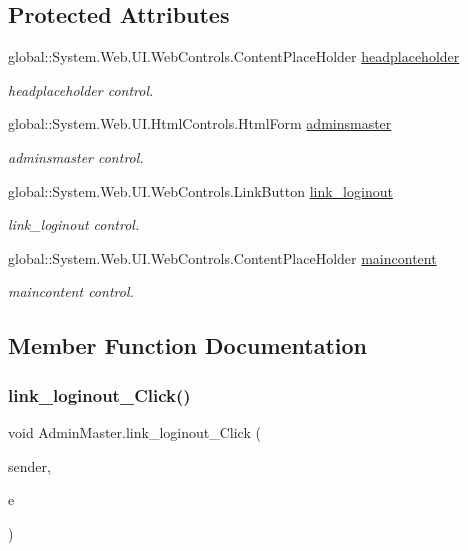 \subsection*{Protected Attributes}
\begin{DoxyCompactItemize}
\item 
global\+::\+System.\+Web.\+U\+I.\+Web\+Controls.\+Content\+Place\+Holder \mbox{\hyperlink{class_admin_master_a0336b034c5bd3fdcac6e741a0dd46d3e}{headplaceholder}}
\begin{DoxyCompactList}\small\item\em headplaceholder control. \end{DoxyCompactList}\item 
global\+::\+System.\+Web.\+U\+I.\+Html\+Controls.\+Html\+Form \mbox{\hyperlink{class_admin_master_a7a0a68bcef19e4ad48d5ce115625bcb3}{adminsmaster}}
\begin{DoxyCompactList}\small\item\em adminsmaster control. \end{DoxyCompactList}\item 
global\+::\+System.\+Web.\+U\+I.\+Web\+Controls.\+Link\+Button \mbox{\hyperlink{class_admin_master_af034ac4b0169ee38de68a4890606ff72}{link\+\_\+loginout}}
\begin{DoxyCompactList}\small\item\em link\+\_\+loginout control. \end{DoxyCompactList}\item 
global\+::\+System.\+Web.\+U\+I.\+Web\+Controls.\+Content\+Place\+Holder \mbox{\hyperlink{class_admin_master_ae059b3c96b9ee11748016a1a433f960f}{maincontent}}
\begin{DoxyCompactList}\small\item\em maincontent control. \end{DoxyCompactList}\end{DoxyCompactItemize}


\subsection{Member Function Documentation}
\mbox{\label{class_admin_master_ac6ec92f844bb740a14a77e7e0932c15f}} 
\subsubsection{\texorpdfstring{link\_loginout\_Click()}{link\_loginout\_Click()}}
{\footnotesize\ttfamily void Admin\+Master.\+link\+\_\+loginout\+\_\+\+Click (\begin{DoxyParamCaption}\item[{object}]{sender,  }\item[{Event\+Args}]{e }\end{DoxyParamCaption})\hspace{0.3cm}{\ttfamily [protected]}}

